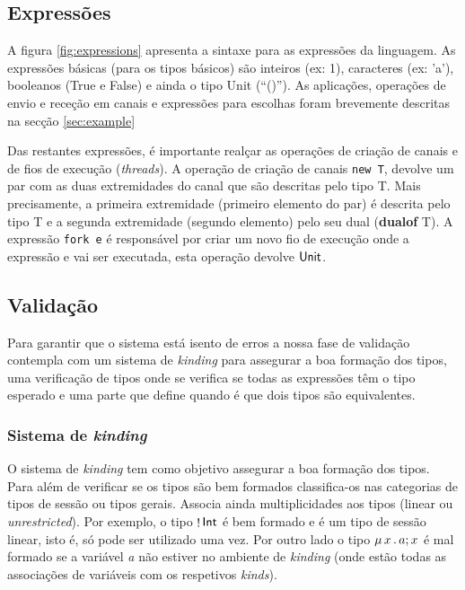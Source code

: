 \subsection{Expressões}
A figura \ref{fig:expressions} apresenta a sintaxe para as expressões da linguagem. As expressões básicas (para os tipos básicos) são inteiros (ex: 1), caracteres (ex: 'a'), booleanos (True e False) e ainda o tipo Unit (``()'').
As aplicações, operações de envio e receção em canais e expressões para escolhas foram brevemente descritas na secção \ref{sec:example}

Das restantes expressões, é importante realçar as operações de criação de canais e de fios de execução (\textit{threads}).
A operação de criação de canais \lstinline"new T", devolve um par com as duas extremidades do canal que são descritas pelo tipo T. Mais precisamente, a primeira extremidade (primeiro elemento do par) é descrita pelo tipo T e a segunda extremidade (segundo elemento) pelo seu dual (\textbf{dualof} T).
A expressão \lstinline"fork e" é responsável por criar um novo fio de execução onde a expressão e vai ser executada, esta operação devolve $\mathsf{Unit}$.


\subsection{Validação}

Para garantir que o sistema está isento de erros a nossa fase de validação contempla com um sistema de \textit{kinding} para assegurar a boa formação dos tipos, uma verificação de tipos onde se verifica se todas as expressões têm o tipo esperado e uma parte que define quando é que dois tipos são equivalentes.

\subsubsection{Sistema de \textit{kinding}}
O sistema de \textit{kinding} tem como objetivo assegurar a boa formação dos tipos. Para além de verificar se os tipos são bem formados classifica-os nas categorias de tipos de sessão ou tipos gerais. Associa ainda multiplicidades aos tipos (linear ou \textit{unrestricted}).
Por exemplo, o tipo $\mathop!\mathsf{Int}$ é bem formado e é um tipo de sessão linear, isto é, só pode ser utilizado uma vez. Por outro lado o tipo $\mu\,x\,.\,a;x$ é mal formado se a variável \textit{a} não estiver no ambiente de \textit{kinding} (onde estão todas as associações de variáveis com os respetivos \textit{kinds}).

